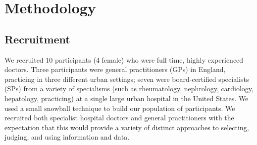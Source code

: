 \documentclass{sigchi}
\begin{document}









\section{Methodology}
\subsection{Recruitment}
We recruited 10 participants (4 female) who were full time, highly experienced doctors.  Three participants were general practitioners (GPs) in England, practicing in three different urban settings; seven were board-certified specialists (SPs) from a variety of specialisms (such as rheumatology, nephrology, cardiology, hepatology, practicing) at a single large urban hospital in the United States.  We used a small snowball technique to build our population of participants.   We recruited both specialist hospital doctors and general practitioners with the expectation that this would provide a variety of distinct approaches to selecting, judging, and using information and data.
\end{document}
